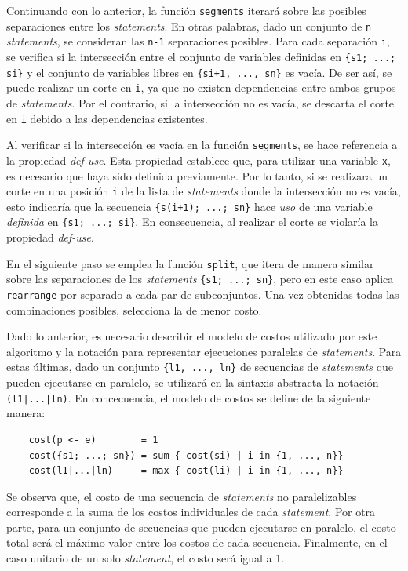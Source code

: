 Continuando con lo anterior, la función \verb|segments| iterará sobre las posibles separaciones entre los \textit{statements}. En otras palabras, dado un conjunto de \verb|n| \textit{statements}, se consideran las \verb|n-1| separaciones posibles. Para cada separación \verb|i|, se verifica si la intersección entre el conjunto de variables definidas en \verb|{s1; ...; si}| y el conjunto de variables libres en \verb|{si+1, ..., sn}| es vacía. De ser así, se puede realizar un corte en \verb|i|, ya que no existen dependencias entre ambos grupos de \textit{statements}. Por el contrario, si la intersección no es vacía, se descarta el corte en \verb|i| debido a las dependencias existentes.

Al verificar si la intersección es vacía en la función \verb|segments|, se hace referencia a la propiedad \textit{def-use}. Esta propiedad establece que, para utilizar una variable \verb|x|, es necesario que haya sido definida previamente. Por lo tanto, si se realizara un corte en una posición \verb|i| de la lista de \textit{statements} donde la intersección no es vacía, esto indicaría que la secuencia \verb|{s(i+1); ...; sn}| hace \textit{uso} de una variable \textit{definida} en \verb|{s1; ...; si}|. En consecuencia, al realizar el corte se violaría la propiedad \textit{def-use}.

En el siguiente paso se emplea la función \verb|split|, que itera de manera similar sobre las separaciones de los \textit{statements} \verb|{s1; ...; sn}|, pero en este caso aplica \verb|rearrange| por separado a cada par de subconjuntos. Una vez obtenidas todas las combinaciones posibles, selecciona la de menor costo. 

Dado lo anterior, es necesario describir el modelo de costos utilizado por este algoritmo y la notación para representar ejecuciones paralelas de \textit{statements}. Para estas últimas, dado un conjunto \verb|{l1, ..., ln}| de secuencias de \textit{statements} que pueden ejecutarse en paralelo, se utilizará en la sintaxis abstracta la notación \verb!(l1|...|ln)!. En concecuencia, el modelo de costos se define de la siguiente manera:

\begin{verbatim}
    cost(p <- e)        = 1
    cost({s1; ...; sn}) = sum { cost(si) | i in {1, ..., n}}
    cost(l1|...|ln)     = max { cost(li) | i in {1, ..., n}}
\end{verbatim}

Se observa que, el costo de una secuencia de \textit{statements} no paralelizables corresponde a la suma de los costos individuales de cada \textit{statement}. Por otra parte, para un conjunto de secuencias que pueden ejecutarse en paralelo, el costo total será el máximo valor entre los costos de cada secuencia. Finalmente, en el caso unitario de un solo \textit{statement}, el costo será igual a 1.

